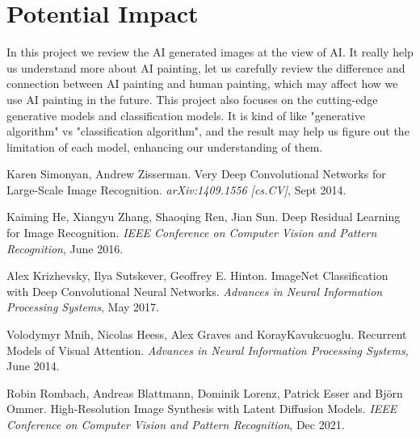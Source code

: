\documentclass[10pt]{article}
\begin{document}
\section{Potential Impact}

In this project we review the AI generated images at the view of AI. It really help us understand more about AI painting, let us carefully review the difference and connection between AI painting and human painting,
which may affect how we use AI painting in the future. This project also focuses on the cutting-edge generative models and classification models. It is kind of like "generative algorithm" vs "classification algorithm",
and the result may help us figure out the limitation of each model, enhancing our understanding of them.

\begin{thebibliography}{1}
  Karen Simonyan, Andrew Zisserman. Very Deep Convolutional Networks for Large-Scale Image Recognition. \emph{arXiv:1409.1556 [cs.CV]}, Sept 2014.
  
  Kaiming He, Xiangyu Zhang, Shaoqing Ren, Jian Sun. Deep Residual Learning for Image Recognition. \emph{IEEE Conference on Computer Vision and Pattern Recognition}, June 2016.

  Alex Krizhevsky, Ilya Sutskever, Geoffrey E. Hinton. ImageNet Classification with Deep Convolutional Neural Networks. \emph{Advances in Neural Information Processing Systems}, May 2017.

  Volodymyr Mnih, Nicolas Heess, Alex Graves and KorayKavukcuoglu. Recurrent Models of Visual Attention. \emph{Advances in Neural Information Processing Systems}, June 2014.

  \bibitem{}
  Robin Rombach, Andreas Blattmann, Dominik Lorenz, Patrick Esser and Björn Ommer. High-Resolution Image Synthesis with Latent Diffusion Models. \emph{IEEE Conference on Computer Vision and Pattern Recognition}, Dec 2021.
\end{thebibliography}
\end{document}
